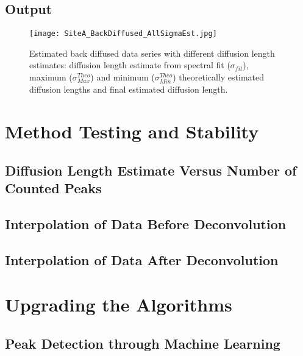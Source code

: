\documentclass[../../CompleteThesis/Complete_1stDraft.tex]{subfiles}
\begin{document}
\subsection[Output]{Output}

\begin{figure}
	\centering
	\texttt{[image: SiteA\_BackDiffused\_AllSigmaEst.jpg]}
	\caption[All diffusion length estimate deconvolutions, Site A]{Estimated back diffused data series with different diffusion length estimates: diffusion length estimate from spectral fit ($\sigma_{fit}$), maximum ($\sigma_{Max}^{Theo}$) and minimum ($\sigma_{Min}^{Theo}$) theoretically estimated diffusion lengths and final estimated diffusion length.}
	\label{fig:SiteA_BackDiffused_AllSigmaEst}
\end{figure}

\section[Stability Tests]{Method Testing and Stability}

\subsection[Maximal $N_{\text{peaks}}$]{Diffusion Length Estimate Versus Number of Counted Peaks}

\subsection[Interpolation 1]{Interpolation of Data Before Deconvolution}

\subsection[Interpolation 2]{Interpolation of Data After Deconvolution}


\section[Upgrading the Algorithms]{Upgrading the Algorithms}
\subsection[Peak Detection: ML]{Peak Detection through Machine Learning}
\end{document}
